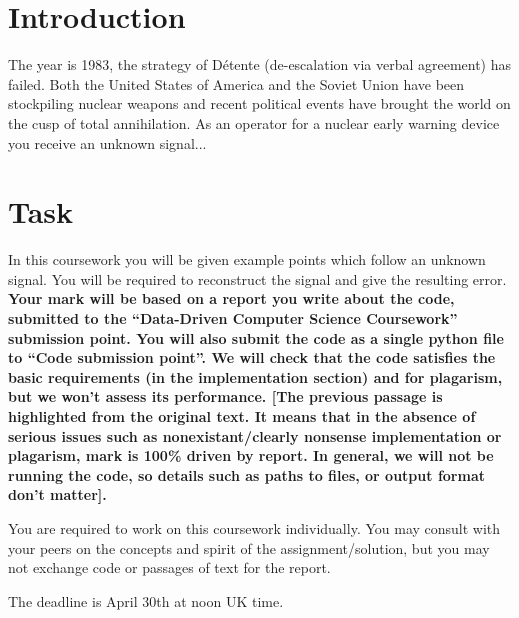 \documentclass[10pt]{article}
\date{}
\author{Originally by: Michael Wray \& Davide Moltisanti}
\begin{document}
\maketitle

\section{Introduction}
\label{sec:intro}
The year is 1983, the strategy of D\'etente (de-escalation via verbal agreement) has failed.
Both the United States of America and the Soviet Union have been stockpiling nuclear weapons and recent political events have brought the world on the cusp of total annihilation.
As an operator for a nuclear early warning device you receive an unknown signal... 

\section{Task}
\label{sec:task}
In this coursework you will be given example points which follow an unknown signal.
You will be required to reconstruct the signal and give the resulting error.
\textbf{Your mark will be based on a report you write about the code, submitted to the ``Data-Driven Computer Science Coursework'' submission point.
You will also submit the code as a single python file to ``Code submission point''.  
We will check that the code satisfies the basic requirements (in the implementation section) and for plagarism, but we won't assess its performance. [The previous passage is highlighted from the original text. It means that in the absence of serious issues such as nonexistant/clearly nonsense implementation or plagarism, mark is 100\% driven by report.  In general, we will not be running the code, so details such as paths to files, or output format don't matter].}

You are required to work on this coursework individually. You may consult with your peers on the concepts and spirit of the assignment/solution, but you may not exchange code or passages of text for the report.

The deadline is April 30th at noon UK time.
\end{document}
